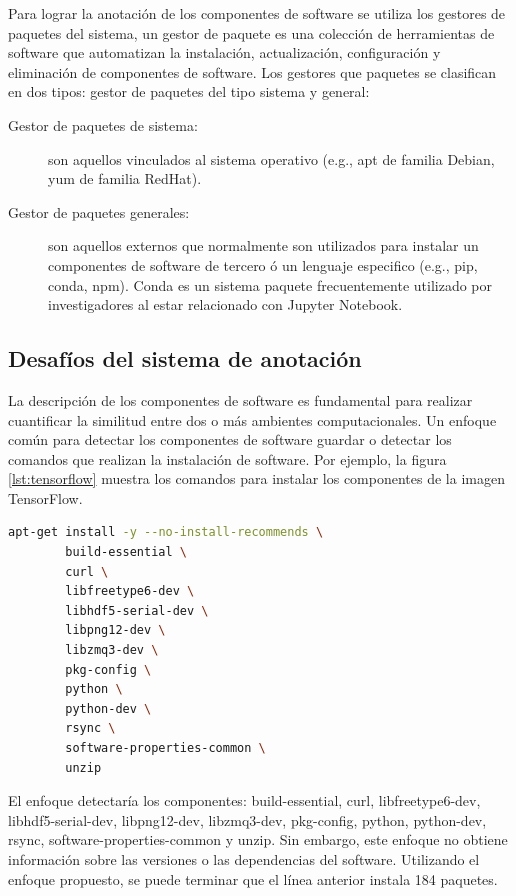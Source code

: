 Para lograr la anotación de los componentes de software se utiliza los gestores de paquetes del sistema, un gestor de paquete es una colección de herramientas de software que automatizan la instalación, actualización, configuración y eliminación de componentes de software. 
Los gestores que paquetes se clasifican en dos tipos: gestor de paquetes del tipo sistema y general:

\begin{description}
	\item  [Gestor de paquetes de sistema:] son aquellos vinculados al sistema operativo (e.g., apt de familia Debian, yum de familia RedHat).
	\item [Gestor de paquetes generales:] son aquellos externos que normalmente son utilizados para instalar un componentes de software de tercero ó un lenguaje especifico (e.g., pip, conda, npm). Conda es un sistema paquete frecuentemente utilizado por investigadores al estar relacionado con Jupyter Notebook.
\end{description}

\subsection{Desafíos del sistema de anotación}\label{s4.2.3}

La descripción de los componentes de software es fundamental para realizar cuantificar la similitud entre dos o más ambientes computacionales.
Un enfoque común para detectar los componentes de software guardar o detectar los comandos que realizan la instalación de software. Por ejemplo, la figura \ref{lst:tensorflow} muestra los comandos para instalar los componentes de la imagen TensorFlow. 

\begin{lstlisting}[caption={Ejemplo de instalación de dependencias para la imagen TensorFlow},label={lst:tensorflow},language=bash]
apt-get install -y --no-install-recommends \
        build-essential \
        curl \
        libfreetype6-dev \
        libhdf5-serial-dev \
        libpng12-dev \
        libzmq3-dev \
        pkg-config \
        python \
        python-dev \
        rsync \
        software-properties-common \
        unzip	
\end{lstlisting}

El enfoque detectaría los componentes: build-essential, curl, libfreetype6-dev, libhdf5-serial-dev, libpng12-dev, libzmq3-dev, pkg-config, python, python-dev, rsync, software-properties-common y unzip. Sin embargo, este enfoque no obtiene información sobre las versiones o las dependencias del software. Utilizando el  enfoque propuesto, se puede terminar que el línea anterior instala 184 paquetes.

